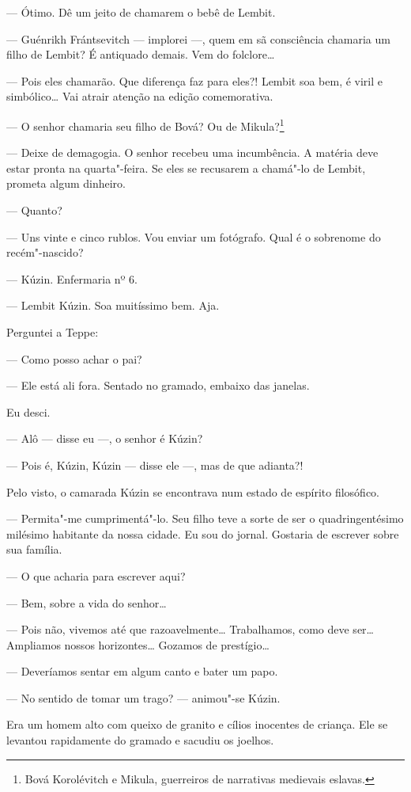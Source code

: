 --- Ótimo. Dê um jeito de chamarem o bebê de Lembit.

--- Guénrikh Frántsevitch --- implorei ---, quem em sã consciência
chamaria um filho de Lembit? É antiquado demais. Vem do folclore\ldots{}

--- Pois eles chamarão. Que diferença faz para eles?! Lembit soa bem, é
viril e simbólico\ldots{} Vai atrair atenção na edição comemorativa.

--- O senhor chamaria seu filho de Bová? Ou de Mikula?\footnote{Bová
  Korolévitch e Mikula, guerreiros de narrativas medievais eslavas.}

--- Deixe de demagogia. O senhor recebeu uma incumbência. A matéria deve
estar pronta na quarta"-feira. Se eles se recusarem a chamá"-lo de Lembit,
prometa algum dinheiro.

--- Quanto?

--- Uns vinte e cinco rublos. Vou enviar um fotógrafo. Qual é o
sobrenome do recém"-nascido?

--- Kúzin. Enfermaria nº 6.

--- Lembit Kúzin. Soa muitíssimo bem. Aja.

Perguntei a Teppe:

--- Como posso achar o pai?

--- Ele está ali fora. Sentado no gramado, embaixo das janelas.

Eu desci.

--- Alô --- disse eu ---, o senhor é Kúzin?

--- Pois é, Kúzin, Kúzin --- disse ele ---, mas de que adianta?!

Pelo visto, o camarada Kúzin se encontrava num estado de espírito
filosófico.

--- Permita"-me cumprimentá"-lo. Seu filho teve a sorte de ser o
quadringentésimo milésimo habitante da nossa cidade. Eu sou do jornal.
Gostaria de escrever sobre sua família.

--- O que acharia para escrever aqui?

--- Bem, sobre a vida do senhor\ldots{}

--- Pois não, vivemos até que razoavelmente\ldots{} Trabalhamos, como deve
ser\ldots{} Ampliamos nossos horizontes\ldots{} Gozamos de prestígio\ldots{}

--- Deveríamos sentar em algum canto e bater um papo.

--- No sentido de tomar um trago? --- animou"-se Kúzin.

Era um homem alto com queixo de granito e cílios inocentes de criança.
Ele se levantou rapidamente do gramado e sacudiu os joelhos.

